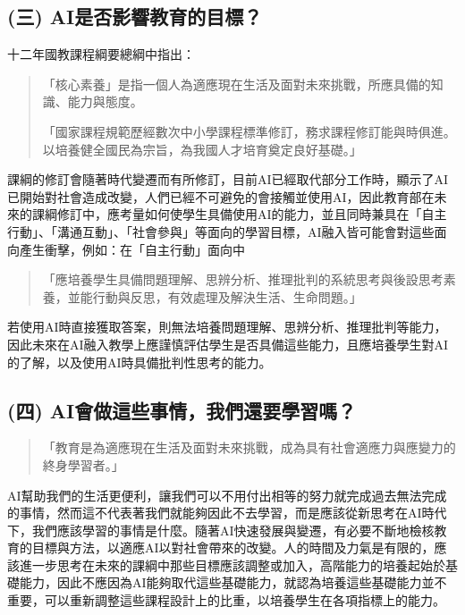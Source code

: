 \subsection{(三) AI是否影響教育的目標？}\label{sec:結論三}

十二年國教課程綱要總綱中指出：

\begin{quote}
「核心素養」是指一個人為適應現在生活及面對未來挑戰，所應具備的知識、能力與態度。

「國家課程規範歷經數次中小學課程標準修訂，務求課程修訂能與時俱進。以培養健全國民為宗旨，為我國人才培育奠定良好基礎。」
\end{quote}

課綱的修訂會隨著時代變遷而有所修訂，目前AI已經取代部分工作時，顯示了AI已開始對社會造成改變，人們已經不可避免的會接觸並使用AI，因此教育部在未來的課綱修訂中，應考量如何使學生具備使用AI的能力，並且同時兼具在「自主行動」、「溝通互動」、「社會參與」等面向的學習目標，AI融入皆可能會對這些面向產生衝擊，例如：在「自主行動」面向中

\begin{quote}
「應培養學生具備問題理解、思辨分析、推理批判的系統思考與後設思考素養，並能行動與反思，有效處理及解決生活、生命問題。」
\end{quote}

若使用AI時直接獲取答案，則無法培養問題理解、思辨分析、推理批判等能力，因此未來在AI融入教學上應謹慎評估學生是否具備這些能力，且應培養學生對AI的了解，以及使用AI時具備批判性思考的能力。

\subsection{(四) AI會做這些事情，我們還要學習嗎？}\label{sec:結論四}

\begin{quote}
「教育是為適應現在生活及面對未來挑戰，成為具有社會適應力與應變力的終身學習者。」
\end{quote}

AI幫助我們的生活更便利，讓我們可以不用付出相等的努力就完成過去無法完成的事情，然而這不代表著我們就能夠因此不去學習，而是應該從新思考在AI時代下，我們應該學習的事情是什麼。隨著AI快速發展與變遷，有必要不斷地檢核教育的目標與方法，以適應AI以對社會帶來的改變。人的時間及力氣是有限的，應該進一步思考在未來的課綱中那些目標應該調整或加入，高階能力的培養起始於基礎能力，因此不應因為AI能夠取代這些基礎能力，就認為培養這些基礎能力並不重要，可以重新調整這些課程設計上的比重，以培養學生在各項指標上的能力。


